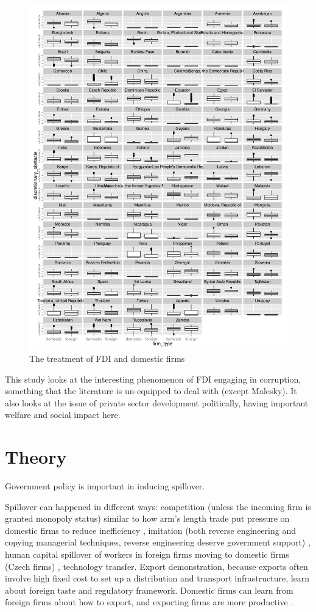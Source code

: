 \documentclass[12pt]{article}
\begin{document}
\begin{figure}[!ht]
\includegraphics[width=\textwidth, height=\textheight,keepaspectratio]{../figure/fdi_domestic_treatment}
\caption{The treatment of FDI and domestic firms}
\label{fig:fdi_domestic_treatment}
\end{figure}

This study looks at the interesting phenomenon of FDI engaging in corruption, something that the literature is un-equipped to deal with (except Malesky). It also looks at the issue of private sector development politically, having important welfare and social impact here.


\section{Theory}

Government policy is important in inducing spillover.

Spillover can happened in different ways: competition (unless the incoming firm is granted monopoly status) similar to how arm's length trade put pressure on domestic firms to reduce inefficiency \citep{Glass2002}, imitation (both reverse engineering and copying managerial techniques, reverse engineering deserve government support) \citep{Wang1992}, human capital spillover of workers in foreign firms moving to domestic firms (Czech firms) \citep{Djankov2000}, technology transfer. Export demonstration, because exports often involve high fixed cost to set up a distribution and transport infrastructure, learn about foreign taste and regulatory framework. Domestic firms can learn from foreign firms about how to export, and exporting firms are more productive \citep{Aitken1997}.
\end{document}
